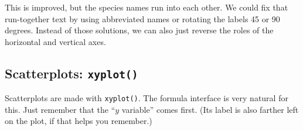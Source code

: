 This is improved, but the species names run into each other.
We could fix that run-together text by using abbreviated names or rotating the
labels 45 or 90 degrees.  Instead of those solutions, we can also just reverse the roles
of the horizontal and vertical axes.
\begin{knitrout}
\end{knitrout}


\vspace{-12mm}


\subsection{Scatterplots: \texttt{xyplot()}}

Scatterplots are made with \verb!xyplot()!.  The formula interface is very natural for this.  
Just remember that the ``$y$ variable'' comes first.  (Its label is also farther left on 
the plot, if that helps you remember.)
\begin{knitrout}
\end{knitrout}


